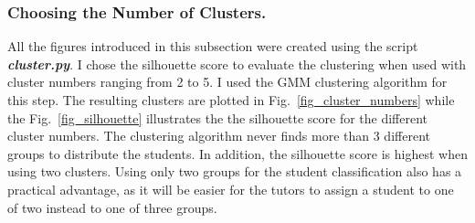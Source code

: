 \subsubsection{Choosing the Number of Clusters.}
All the figures introduced in this subsection were created using the script \textbf{\emph{cluster.py}}. I chose the silhouette score to evaluate the clustering when used with cluster numbers ranging from 2 to 5. I used the GMM clustering algorithm for this step. The resulting clusters are plotted in Fig.~\ref{fig_cluster_numbers} while the Fig.~\ref{fig_silhouette} illustrates the the silhouette score for the different cluster numbers. The clustering algorithm never finds more than 3 different groups to distribute the students. In addition, the silhouette score is highest when using two clusters. Using only two groups for the student classification also has a practical advantage, as it will be easier for the tutors to assign a student to one of two instead to one of three groups. 

